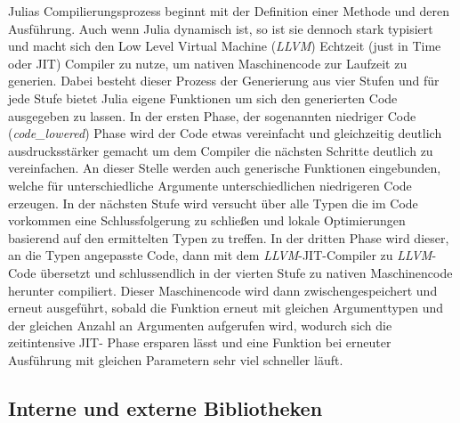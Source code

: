 \documentclass[proseminar,german,utf8]{zihpub}
\begin{document}
Julias Compilierungsprozess beginnt mit der Definition einer Methode und deren Ausführung. Auch wenn Julia dynamisch ist, so ist sie dennoch stark typisiert und macht sich den Low Level Virtual Machine (\textit{LLVM}) Echtzeit (just in Time oder JIT) Compiler zu nutze, um nativen Maschinencode zur Laufzeit zu generien. Dabei besteht dieser Prozess der Generierung aus vier Stufen und für jede Stufe bietet Julia eigene Funktionen um sich den generierten Code ausgegeben zu lassen. In der ersten Phase, der sogenannten niedriger Code (\textit{code\_lowered}) Phase wird der Code etwas vereinfacht und gleichzeitig deutlich ausdrucksstärker gemacht um dem Compiler die nächsten Schritte deutlich zu vereinfachen. An dieser Stelle werden auch generische Funktionen eingebunden, welche für unterschiedliche Argumente unterschiedlichen niedrigeren Code erzeugen. In der nächsten Stufe wird versucht über alle Typen die im Code vorkommen eine Schlussfolgerung zu schließen und lokale Optimierungen basierend auf den ermittelten Typen zu treffen. In der dritten Phase wird dieser, an die Typen angepasste Code, dann mit dem \textit{LLVM}-JIT-Compiler zu \textit{LLVM}-Code übersetzt  und schlussendlich in der vierten Stufe zu nativen Maschinencode herunter compiliert. Dieser Maschinencode wird dann zwischengespeichert und erneut ausgeführt, sobald die Funktion erneut mit gleichen Argumenttypen und der gleichen Anzahl an Argumenten aufgerufen wird, wodurch sich die zeitintensive JIT- Phase ersparen lässt und eine Funktion bei erneuter Ausführung mit gleichen Parametern sehr viel schneller läuft.

\subsection{Interne und externe Bibliotheken}
\end{document}
